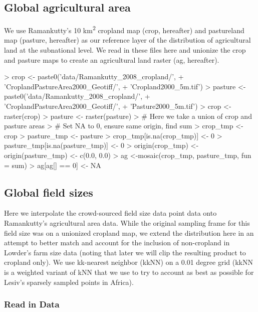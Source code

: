 \documentclass{article}
\begin{document}
\subsection{Global agricultural area}

We use Ramankutty's 10 km\textsuperscript{2} cropland map (crop, hereafter) and pastureland map (pasture, hereafter) as our reference layer of the distribution of agricultural land at the subnational level.  We read in these files here and unionize the crop and pasture maps to create an agricultural land raster (ag, hereafter).

\begin{Schunk}
\begin{Sinput}
> crop <- paste0('data/Ramankutty_2008_cropland/',
+                 'CroplandPastureArea2000_Geotiff/',
+                 'Cropland2000_5m.tif')
> pasture <- paste0('data/Ramankutty_2008_cropland/',
+                   'CroplandPastureArea2000_Geotiff/',
+                   'Pasture2000_5m.tif')
> crop <- raster(crop)
> pasture <- raster(pasture)
> # Here we take a union of crop and pasture areas
> # Set NA to 0, ensure same origin, find sum 
> crop_tmp <- crop
> pasture_tmp <- pasture
> crop_tmp[is.na(crop_tmp)] <- 0
> pasture_tmp[is.na(pasture_tmp)] <- 0
> origin(crop_tmp) <- origin(pasture_tmp) <- c(0.0, 0.0)
> ag <-mosaic(crop_tmp, pasture_tmp, fun = sum)
> ag[ag[] == 0] <- NA 
\end{Sinput}
\end{Schunk}

\subsection{Global field sizes}

Here we interpolate the crowd-sourced field size data point data onto Ramankutty's agricultural area data. While the original sampling frame for this field size was on a unionized cropland map, we extend the distribution here in an attempt to better match and account for the inclusion of non-cropland in Lowder's farm size data (noting that later we will clip the resulting product to cropland only).  We use kk-nearest neighbor (kkNN) on a 0.01 degree grid (kkNN is a weighted variant of kNN that we use to try to account as best as possible for Lesiv's sparsely sampled points in Africa).

\subsubsection{Read in Data}
\end{document}
